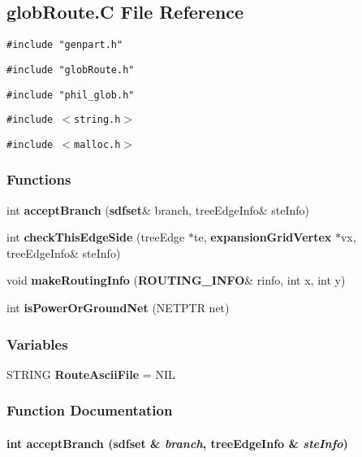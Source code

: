 \subsection{glob\-Route.C File Reference}
\label{globRoute.C}
{\tt \#include "genpart.h"}\par
{\tt \#include "glob\-Route.h"}\par
{\tt \#include "phil\_\-glob.h"}\par
{\tt \#include $<$string.h$>$}\par
{\tt \#include $<$malloc.h$>$}\par
\subsubsection*{Functions}
\begin{CompactItemize}
\item 
int {\bf accept\-Branch} ({\bf sdfset}\& branch, tree\-Edge\-Info\& ste\-Info)
\item 
int {\bf check\-This\-Edge\-Side} (tree\-Edge $\ast$te, {\bf expansion\-Grid\-Vertex} $\ast$vx, tree\-Edge\-Info\& ste\-Info)
\item 
void {\bf make\-Routing\-Info} ({\bf ROUTING\_\-INFO}\& rinfo, int x, int y)
\item 
int {\bf is\-Power\-Or\-Ground\-Net} (NETPTR net)
\end{CompactItemize}
\subsubsection*{Variables}
\begin{CompactItemize}
\item 
STRING {\bf Route\-Ascii\-File} = NIL
\end{CompactItemize}


\subsubsection{Function Documentation}
\label{globRoute.C_a0}
\paragraph{\setlength{\rightskip}{0pt plus 5cm}int accept\-Branch ({\bf sdfset} \& {\em branch}, tree\-Edge\-Info \& {\em ste\-Info})\hspace{0.3cm}{\tt  [static]}}\hfill



